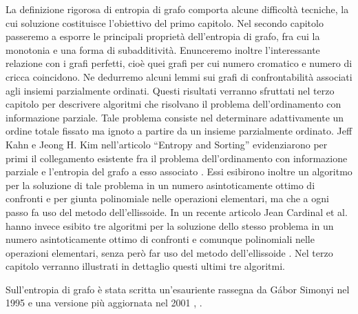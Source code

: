 \documentclass[12pt]{article}
\begin{document}
La definizione rigorosa di entropia di grafo comporta alcune difficoltà 
tecniche, la cui soluzione costituisce l'obiettivo del primo capitolo. Nel 
secondo capitolo passeremo a esporre le principali proprietà dell'entropia di 
grafo, fra cui la monotonia e una forma di subadditività. Enunceremo inoltre 
l'interessante relazione con i grafi perfetti, cioè quei grafi per cui numero 
cromatico e numero di cricca coincidono. Ne dedurremo alcuni lemmi sui grafi 
di confrontabilità associati agli insiemi parzialmente ordinati. Questi 
risultati verranno sfruttati nel terzo capitolo per descrivere algoritmi che 
risolvano il problema dell'ordinamento con informazione parziale. Tale 
problema consiste nel determinare adattivamente un ordine totale fissato ma 
ignoto a partire da un insieme parzialmente ordinato. Jeff Kahn e Jeong H. Kim 
nell'articolo ``Entropy and Sorting'' evidenziarono per primi il collegamento 
esistente fra il problema dell'ordinamento con informazione parziale e 
l'entropia del grafo a esso associato \cite{Kahn1995}. Essi esibirono inoltre 
un algoritmo per la soluzione di tale problema in un numero asintoticamente 
ottimo di confronti e per giunta polinomiale nelle operazioni elementari, ma 
che a ogni passo fa uso del metodo dell'ellissoide. In un recente articolo 
Jean Cardinal et al. hanno invece esibito tre algoritmi per la soluzione dello 
stesso problema in un numero asintoticamente ottimo di confronti e comunque 
polinomiali nelle operazioni elementari, senza però far uso del metodo 
dell'ellissoide \cite{Cardinal2010}. Nel terzo capitolo verranno illustrati in 
dettaglio questi ultimi tre algoritmi.

Sull'entropia di grafo è stata scritta un'esauriente rassegna da G\'abor 
Simonyi nel 1995 e una versione più aggiornata nel 2001 \cite{Simonyi1995}, 
\cite{Simonyi2001}.

\printbibliography
\end{document}
